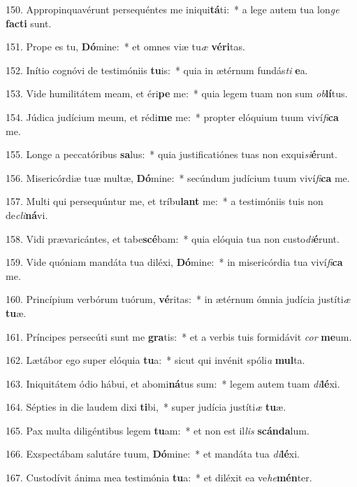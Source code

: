 150. Appropinquavérunt persequéntes me iniqui\textbf{tá}ti:~*  a lege autem tua lon\textit{ge} \textbf{fac}\textbf{ti} sunt.\

151. Prope es tu, \textbf{Dó}mine:~*  et omnes viæ tu\textit{æ} \textbf{vé}\textbf{ri}tas.\

152. Inítio cognóvi de testimóniis \textbf{tu}is:~*  quia in ætérnum fundás\textit{ti} \textbf{e}a.\

153. Vide humilitátem meam, et éri\textbf{pe} me:~*  quia legem tuam non sum \textit{ob}\textbf{lí}tus.\

154. Júdica judícium meum, et rédi\textbf{me} me:~*  propter elóquium tuum viví\textit{fi}\textbf{ca} me.\

155. Longe a peccatóribus \textbf{sa}lus:~*  quia justificatiónes tuas non exqui\textit{si}\textbf{é}runt.\

156. Misericórdiæ tuæ multæ, \textbf{Dó}mine:~*  secúndum judícium tuum viví\textit{fi}\textbf{ca} me.\

157. Multi qui persequúntur me, et tríbu\textbf{lant} me:~*  a testimóniis tuis non de\textit{cli}\textbf{ná}vi.\

158. Vidi prævaricántes, et tabe\textbf{scé}bam:~*  quia elóquia tua non custo\textit{di}\textbf{é}runt.\

159. Vide quóniam mandáta tua diléxi, \textbf{Dó}mine:~*  in misericórdia tua viví\textit{fi}\textbf{ca} me.\

160. Princípium verbórum tuórum, \textbf{vé}ritas:~*  in ætérnum ómnia judícia justíti\textit{æ} \textbf{tu}æ.\

161. Príncipes persecúti sunt me \textbf{gra}tis:~*  et a verbis tuis formidávit \textit{cor} \textbf{me}um.\

162. Lætábor ego super elóquia \textbf{tu}a:~*  sicut qui invénit spóli\textit{a} \textbf{mul}ta.\

163. Iniquitátem ódio hábui, et abomi\textbf{ná}tus sum:~*  legem autem tuam \textit{di}\textbf{lé}xi.\

164. Sépties in die laudem dixi \textbf{ti}bi,~*  super judícia justíti\textit{æ} \textbf{tu}æ.\

165. Pax multa diligéntibus legem \textbf{tu}am:~*  et non est il\textit{lis} \textbf{scán}\textbf{da}lum.\

166. Exspectábam salutáre tuum, \textbf{Dó}mine:~*  et mandáta tua \textit{di}\textbf{lé}xi.\

167. Custodívit ánima mea testimónia \textbf{tu}a:~*  et diléxit ea ve\textit{he}\textbf{mén}ter.\


